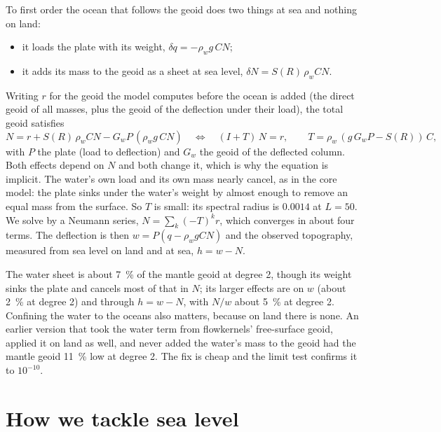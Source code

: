 To first order the ocean that follows the geoid does two things at sea and nothing on land:
\begin{itemize}[nosep]
\item it loads the plate with its weight, $\delta q = -\rho_w g\,C N$;
\item it adds its mass to the geoid as a sheet at sea level, $\delta N = S(R)\,\rho_w C N$.
\end{itemize}
Writing $r$ for the geoid the model computes before the ocean is added (the direct geoid of all masses, plus the geoid of the deflection under their load), the total geoid satisfies
\begin{equation}
    N = r + S(R)\,\rho_w C N - G_w P\,(\rho_w g\,C N)
    \quad\Longleftrightarrow\quad
    (I + T)\,N = r,
    \qquad T = \rho_w\,(g\,G_w P - S(R))\,C,
\end{equation}
with $P$ the plate (load to deflection) and $G_w$ the geoid of the deflected column.
Both effects depend on $N$ and both change it, which is why the equation is implicit.
The water's own load and its own mass nearly cancel, as in the core model: the plate sinks under the water's weight by almost enough to remove an equal mass from the surface. So $T$ is small: its spectral radius is $0.0014$ at $L=50$.
We solve by a Neumann series, $N = \sum_k (-T)^k r$, which converges in about four terms.
The deflection is then $w = P(q - \rho_w g C N)$ and the observed topography, measured from sea level on land and at sea, $h = w - N$.

\begin{defence}
\A The water sheet is about \qty{7}{\percent} of the mantle geoid at degree 2, though its weight sinks the plate and cancels most of that in $N$; its larger effects are on $w$ (about \qty{2}{\percent} at degree 2) and through $h=w-N$, with $N/w$ about \qty{5}{\percent} at degree 2.
Confining the water to the oceans also matters, because on land there is none.
An earlier version that took the water term from flowkernels' free-surface geoid, applied it on land as well, and never added the water's mass to the geoid had the mantle geoid \qty{11}{\percent} low at degree 2.
The fix is cheap and the limit test confirms it to $10^{-10}$.
\end{defence}

\section{How we tackle sea level}


